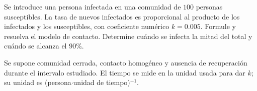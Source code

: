 Se introduce una persona infectada en una comunidad de $100$ personas susceptibles. La tasa de nuevos infectados es proporcional al producto de los infectados y los susceptibles, con coeficiente numérico $k=0.005$. Formule y resuelva el modelo de contacto. Determine cuándo se infecta la mitad del total y cuándo se alcanza el $90\%$.

Se supone comunidad cerrada, contacto homogéneo y ausencia de recuperación durante el intervalo estudiado. El tiempo se mide en la unidad usada para dar $k$; su unidad es (persona$\cdot$unidad de tiempo)$^{-1}$.
